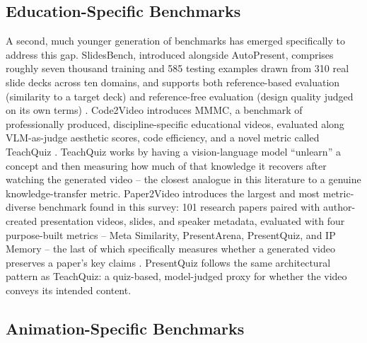\documentclass[journal]{IEEEtran}
\begin{document}
\subsection{Education-Specific Benchmarks}

A second, much younger generation of benchmarks has emerged specifically to address this gap. SlidesBench, introduced alongside AutoPresent, comprises roughly seven thousand training and 585 testing examples drawn from 310 real slide decks across ten domains, and supports both reference-based evaluation (similarity to a target deck) and reference-free evaluation (design quality judged on its own terms) \cite{autopresent2025}. Code2Video introduces MMMC, a benchmark of professionally produced, discipline-specific educational videos, evaluated along VLM-as-judge aesthetic scores, code efficiency, and a novel metric called TeachQuiz \cite{chen2025code2video}. TeachQuiz works by having a vision-language model ``unlearn'' a concept and then measuring how much of that knowledge it recovers after watching the generated video -- the closest analogue in this literature to a genuine knowledge-transfer metric. Paper2Video introduces the largest and most metric-diverse benchmark found in this survey: 101 research papers paired with author-created presentation videos, slides, and speaker metadata, evaluated with four purpose-built metrics -- Meta Similarity, PresentArena, PresentQuiz, and IP Memory -- the last of which specifically measures whether a generated video preserves a paper's key claims \cite{zhu2025paper2video}. PresentQuiz follows the same architectural pattern as TeachQuiz: a quiz-based, model-judged proxy for whether the video conveys its intended content.

\subsection{Animation-Specific Benchmarks}
\end{document}
